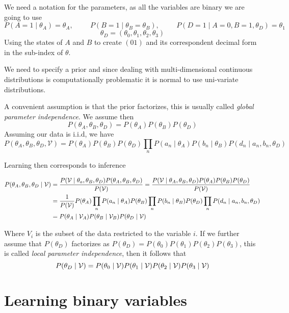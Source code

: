 We need a notation for the parameters, as all the variables are binary we are
going to use
\[
  P(A = 1 \mid \theta_{A}) = \theta_{A}, \hspace{1cm} P(B = 1 \mid \theta_{B} = \theta_{B}), \hspace{1cm} P(D = 1 \mid A = 0, B = 1, \theta_{D}) = \theta_{1}
\]
\[\theta_{D} = (\theta_{0}, \theta_{1}, \theta_{2}, \theta_{3})\]
Using the states of \(A\) and \(B\) to create \((01)\) and its correspondent
decimal form in the sub-index of \(\theta\).

We need to specify a prior and since dealing with multi-dimensional continuous
distributions is computationally problematic it is normal to use uni-variate
distributions.

A convenient assumption is that the prior factorizes, this is usually called
\emph{global parameter independence}. We assume then
\[
  P(\theta_{A}, \theta_{B}, \theta_{D}) = P(\theta_{A})P(\theta_{B})P(\theta_{D})
\]
Assuming our data is i.i.d, we have
\[
  P(\theta_{A}, \theta_{B}, \theta_{D}, \mathcal{V}) = P(\theta_{A})P(\theta_{B})P(\theta_{D})\prod_{n}P(a_{n}\mid \theta_{A})P(b_{n} \mid \theta_{B})P(d_{n}\mid a_{n}, b_{n}, \theta_{D})
\]


Learning then corresponds to inference

\[
  \begin{aligned}
    P(\theta_{A}, \theta_{B}, \theta_{D}\mid \mathcal{V}) &= \frac{P(\mathcal{V} \mid \theta_{a}, \theta_{B}, \theta_{D})P(\theta_{A}, \theta_{B}, \theta_{D})}{P(\mathcal{V})} =\frac{P(\mathcal{V} \mid \theta_{A}, \theta_{B}, \theta_{D})P(\theta_{A}) P(\theta_{B})P( \theta_{D})}{P(\mathcal{V})}\\
    &= \frac{1}{P(\mathcal{V})}P(\theta_{A})\prod_{n}P(a_{n}\mid \theta_{A})P(\theta_{B})\prod_{n}P(b_{n}\mid \theta_{B})P(\theta_{D})\prod_{n}P(d_{n}\mid a_{n}, b_{n},\theta_{D})\\
    &= P(\theta_{A} \mid \mathcal{V}_{A} )P(\theta_{B}\mid \mathcal{V}_{B})P(\theta_{D} \mid \mathcal{V})
  \end{aligned}
\]

Where \(V_{i}\) is the subset of the data restricted to the variable \(i\). If
we further assume that \(P(\theta_{D})\) factorizes as
\(P(\theta_{D}) = P(\theta_{0})P(\theta_{1})P(\theta_{2})P(\theta_{3})\),
this is called \emph{local parameter independence}, then it follows that
\[
  P(\theta_{D}\mid \mathcal{V}) = P(\theta_{0} \mid \mathcal{V} )P(\theta_{1} \mid \mathcal{V} )P(\theta_{2} \mid \mathcal{V} )P(\theta_{3} \mid \mathcal{V} )
\]

\section{Learning binary variables}

